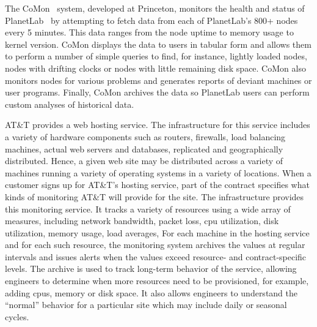 


The CoMon~\cite{comon} system, developed at Princeton, 
monitors the health and status of
PlanetLab~\cite{planetlab} by attempting to
fetch data from each of PlanetLab's 800+ nodes every 5 minutes.  
This data ranges from
the node uptime to memory usage to kernel version.  
CoMon displays the data to users in tabular form and allows them to
perform a number of simple queries to find, for instance, lightly
loaded nodes, nodes with drifting clocks or nodes with little
remaining disk space.  CoMon also monitors nodes for various
problems and generates reports of deviant machines or user
programs.
Finally,  CoMon archives the data so PlanetLab users can perform 
custom analyses of historical data.

AT\&T provides a web hosting service.  The infrastructure for this
service includes a variety of hardware components such as routers,
firewalls, load balancing machines, actual web servers and
databases, replicated and geographically distributed.  Hence, a given
web site may be distributed across a variety of machines running a
variety of operating systems in a variety of locations.  When a
customer signs up for AT\&T's hosting service, part of the contract
specifies what kinds of monitoring AT\&T will provide for the site.
The \vizGems{} infrastructure provides this monitoring
service.  It tracks a variety of resources using a wide array of
measures, including network
bandwidth, packet loss, cpu utilization, disk utilization, memory
usage, load averages, \etc{} For each machine in the hosting service
and for each such resource, the monitoring system archives the values at
regular intervals and issues alerts when the values exceed resource-
and contract-specific levels.  The archive is used to track long-term
behavior of the service, allowing engineers to determine when more
resources need to be provisioned, for example, adding cpus,
memory or disk space.  It also allows engineers to understand the
``normal'' behavior for a particular site which may include daily or
seasonal cycles.


